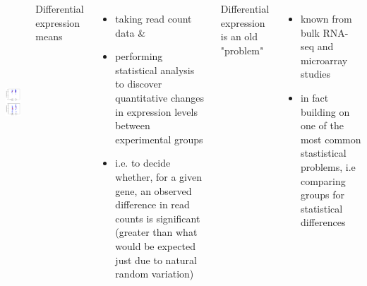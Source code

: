 \documentclass{beamer}\usepackage[]{graphicx}\usepackage[]{color}
\begin{document}
\begin{frame}
\begin{columns}

\includegraphics[width=4.5cm, height=7.5cm]{Images/Wu-2017-01.png}

Differential expression means
\scriptsize
\begin{itemize}
  \item taking read count data \&
  \item performing statistical analysis to discover quantitative changes in expression levels between experimental groups
  \item i.e. to decide whether, for a given gene, an observed difference in read counts is significant (greater than what would be expected just due to natural random variation)
 \end{itemize} \pause
\vspace{0.5cm}
\normalsize 
Differential expression is an old "problem"
\scriptsize
\begin{itemize}
  \item known from bulk RNA-seq and microarray studies
  \item in fact building on one of the most common stastistical problems, i.e comparing groups for statistical differences
 \end{itemize}

\end{columns}
\end{frame}
\end{document}
